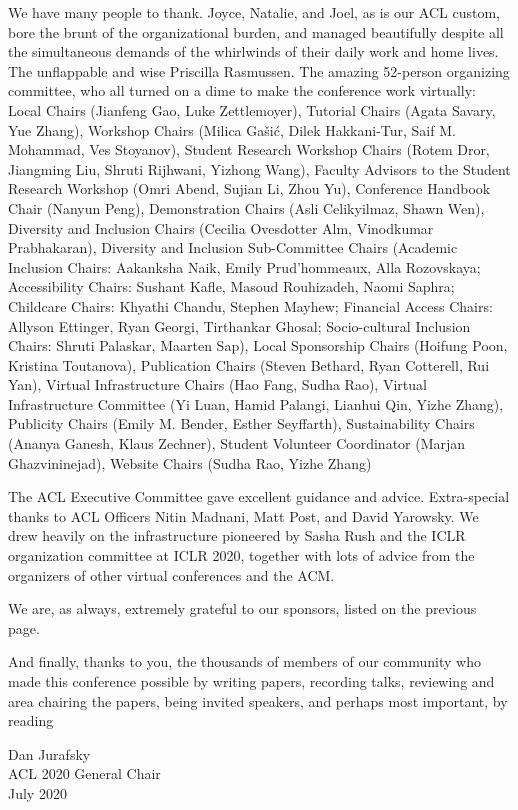We have many people to thank.  Joyce, Natalie, and Joel, as is our ACL custom,
bore the brunt of the organizational burden, and managed beautifully despite all the
simultaneous demands of the whirlwinds of their daily
work and home lives.  The unflappable and wise Priscilla Rasmussen.
The amazing 52-person organizing committee, who all turned on a dime
to make the conference work virtually: Local Chairs (Jianfeng Gao, Luke Zettlemoyer), Tutorial Chairs (Agata Savary, Yue Zhang),
Workshop Chairs (Milica Ga\v{s}i\'{c}, Dilek Hakkani-Tur, Saif M. Mohammad, Ves Stoyanov),
Student Research Workshop Chairs (Rotem Dror, Jiangming Liu, Shruti Rijhwani, Yizhong Wang),
Faculty Advisors to the Student Research Workshop (Omri Abend, Sujian Li, Zhou Yu),
Conference Handbook Chair (Nanyun Peng),
Demonstration Chairs (Asli Celikyilmaz, Shawn Wen),
Diversity and Inclusion Chairs (Cecilia Ovesdotter Alm, Vinodkumar Prabhakaran),
Diversity and Inclusion Sub-Committee Chairs (Academic Inclusion Chairs: Aakanksha Naik, Emily Prud'hommeaux, Alla Rozovskaya;
Accessibility Chairs: Sushant Kafle, Masoud Rouhizadeh, Naomi Saphra;
Childcare Chairs: Khyathi Chandu, Stephen Mayhew;
Financial Access Chairs: Allyson Ettinger, Ryan Georgi, Tirthankar Ghosal;
Socio-cultural Inclusion Chairs: Shruti Palaskar, Maarten Sap),
Local Sponsorship Chairs (Hoifung Poon, Kristina Toutanova),
Publication Chairs (Steven Bethard, Ryan Cotterell, Rui Yan),
Virtual Infrastructure Chairs (Hao Fang, Sudha Rao),
Virtual Infrastructure Committee (Yi Luan, Hamid Palangi, Lianhui Qin, Yizhe Zhang),
Publicity Chairs (Emily M. Bender, Esther Seyffarth),
Sustainability Chairs (Ananya Ganesh, Klaus Zechner),
Student Volunteer Coordinator (Marjan Ghazvininejad),
Website Chairs (Sudha Rao, Yizhe Zhang)

The ACL Executive Committee gave excellent guidance and advice. Extra-special thanks to
ACL Officers Nitin Madnani, Matt Post,  and David Yarowsky.
We drew heavily on the infrastructure pioneered by Sasha Rush and
the ICLR organization committee at ICLR 2020, together with lots
of advice from the organizers of other virtual conferences and the
ACM.

We are, as always, extremely grateful to our sponsors, listed on the previous page.

And finally, thanks to you, the thousands of members of our community
who made this conference possible by writing papers, recording talks, reviewing and area chairing the papers,
being invited speakers, and perhaps most important, by reading

\bigskip
\noindent Dan Jurafsky \\
\noindent ACL 2020 General Chair\\
\noindent July 2020\\